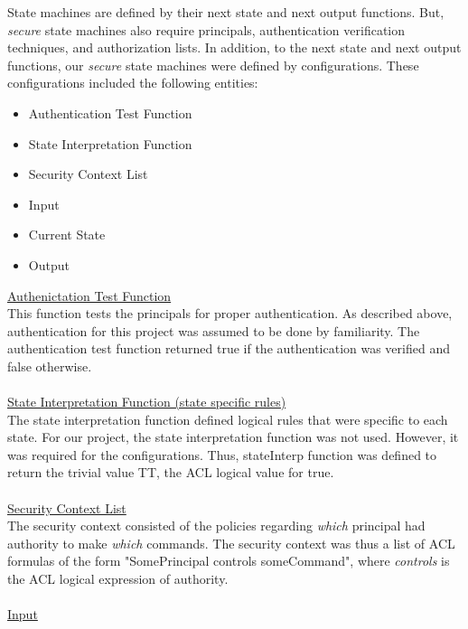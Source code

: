 State machines are defined by their next state and next output functions.  But, \textit{secure} state
machines also require principals, authentication verification techniques, and authorization lists.  In
addition, to the next state and next output functions, our \textit{secure} state machines were defined
by configurations.  These configurations included the following entities:
\begin{itemize}
\item Authentication Test Function
\item State Interpretation Function
\item Security Context List
\item Input
\item Current State
\item Output\\
  \end{itemize}
  \underline{Authenictation Test Function}\\
  This function tests the principals for proper authentication.  As described above,
  authentication for this project was assumed to be done by familiarity.  The authentication
  test function returned true if the authentication was verified and false otherwise. \\\\
  \underline{State Interpretation Function (state specific rules)}\\
  The state interpretation function defined logical rules that were specific to each state.
  For our project, the state interpretation function was not used.  However, it was required
  for the configurations.  Thus, stateInterp function was defined to return the trivial value
  TT, the ACL logical value for true.  \\\\
  \underline{Security Context List}\\
  The security context consisted of the policies regarding \textit{which} principal had authority
  to make \textit{which} commands. The security context was thus a list of ACL formulas of the form
  "SomePrincipal controls someCommand", where \textit{controls} is the ACL logical expression of authority.\\\\
  \underline{Input}
